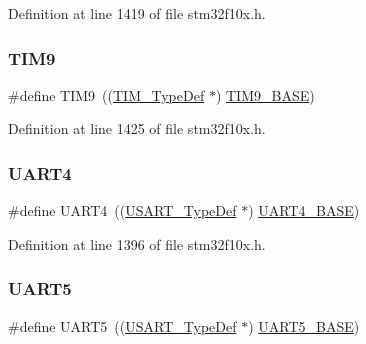Definition at line 1419 of file stm32f10x.\+h.

\mbox{\label{group___peripheral__declaration_gaf52b4b4c36110a0addfa98059f54a50e}} 
\subsubsection{\texorpdfstring{T\+I\+M9}{TIM9}}
{\footnotesize\ttfamily \#define T\+I\+M9~((\hyperlink{struct_t_i_m___type_def}{T\+I\+M\+\_\+\+Type\+Def} $\ast$) \hyperlink{group___peripheral__memory__map_ga92ae902be7902560939223dd765ece08}{T\+I\+M9\+\_\+\+B\+A\+SE})}



Definition at line 1425 of file stm32f10x.\+h.

\mbox{\label{group___peripheral__declaration_ga7c035f6f443c999fc043b2b7fb598800}} 
\subsubsection{\texorpdfstring{U\+A\+R\+T4}{UART4}}
{\footnotesize\ttfamily \#define U\+A\+R\+T4~((\hyperlink{struct_u_s_a_r_t___type_def}{U\+S\+A\+R\+T\+\_\+\+Type\+Def} $\ast$) \hyperlink{group___peripheral__memory__map_ga94d92270bf587ccdc3a37a5bb5d20467}{U\+A\+R\+T4\+\_\+\+B\+A\+SE})}



Definition at line 1396 of file stm32f10x.\+h.

\mbox{\label{group___peripheral__declaration_ga9274e37cf5e8a174fc5dd627b98ec0fe}} 
\subsubsection{\texorpdfstring{U\+A\+R\+T5}{UART5}}
{\footnotesize\ttfamily \#define U\+A\+R\+T5~((\hyperlink{struct_u_s_a_r_t___type_def}{U\+S\+A\+R\+T\+\_\+\+Type\+Def} $\ast$) \hyperlink{group___peripheral__memory__map_gaa155689c0e206e6994951dc3cf31052a}{U\+A\+R\+T5\+\_\+\+B\+A\+SE})}



